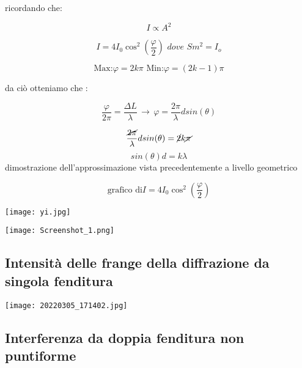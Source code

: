 \documentclass[a4paper,11pt]{article}
\begin{document}
ricordando che: 


\[
I \propto A^2
\]

\[
I=4 I_0 \cos^2(\frac{\varphi}{2}) \, \, \textit{dove} \, \, Sm^2 = I_o
\]

\[
\text{Max:} \varphi = 2k\pi \, \, \text{Min:} \varphi = (2k -1)\pi    
\]

\pagebreak

da ciò otteniamo che :

\begin{center}
    \[ 
    \frac{\varphi}{2 \pi} = \frac{\Delta  L}{\lambda} \, \to \, \varphi = \frac{2 \pi}{\lambda} d sin(\theta)
    \]
\end{center}

\[
\frac{\cancel{2\pi}}{\lambda} d sin(\theta) = \cancel{2} k \cancel{\pi}
\]
\[
sin(\theta) d = k \lambda    
\]
dimostrazione dell'approssimazione vista precedentemente a livello geometrico

\vspace{4mm}

\[
\text{grafico di} I=4 I_0 \cos^2(\frac{\varphi}{2})
\]
\begin{center}
    
\begin{minipage}{15cm}
    \texttt{[image: yi.jpg]}
    \end{minipage}
\end{center}

\begin{center}
\begin{minipage}{10cm}
    \texttt{[image: Screenshot\_1.png]}
    \end{minipage}
\end{center}

\subsection{Intensità delle frange della diffrazione da singola fenditura }

\begin{center}
    

\begin{minipage}{8cm}
    \texttt{[image: 20220305\_171402.jpg]}
    \end{minipage}
\end{center}




\subsection{Interferenza da doppia fenditura non puntiforme }
\end{document}
